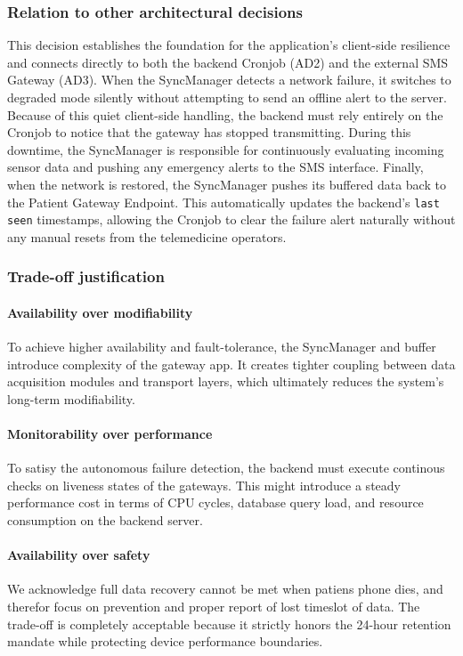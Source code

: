 \subsubsection*{Relation to other architectural decisions}
This decision establishes the foundation for the application's client-side resilience and connects directly to both the backend Cronjob (AD2) and the external SMS Gateway (AD3). When the SyncManager detects a network failure, it switches to degraded mode silently without attempting to send an offline alert to the server. Because of this quiet client-side handling, the backend must rely entirely on the Cronjob to notice that the gateway has stopped transmitting. During this downtime, the SyncManager is responsible for continuously evaluating incoming sensor data and pushing any emergency alerts to the SMS interface. Finally, when the network is restored, the SyncManager pushes its buffered data back to the Patient Gateway Endpoint. This automatically updates the backend's \texttt{last seen} timestamps, allowing the Cronjob to clear the failure alert naturally without any manual resets from the telemedicine operators.


\subsubsection*{Trade-off justification}
\paragraph{Availability over modifiability}
To achieve higher availability and fault-tolerance, the SyncManager and buffer introduce complexity of the gateway app. It creates tighter coupling between data acquisition modules and transport layers, which ultimately reduces the system's long-term modifiability.
\paragraph{Monitorability over performance}
To satisy the autonomous failure detection, the backend must execute continous checks on liveness states of the gateways. This might introduce a steady performance cost in terms of CPU cycles, database query load, and resource consumption on the backend server.
\paragraph{Availability over safety}
We acknowledge full data recovery cannot be met when patiens phone dies, and therefor focus on prevention and proper report of lost timeslot of data.
The trade-off is completely acceptable because it strictly honors the 24-hour retention mandate while protecting device performance boundaries.
